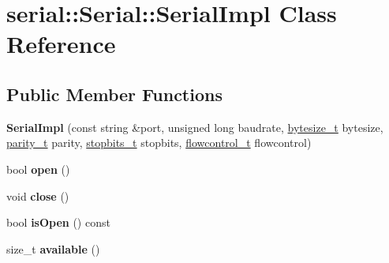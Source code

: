 \hypertarget{classserial_1_1serial_1_1_serial_1_1_serial_impl}{}\section{serial\+:\+:Serial\+:\+:Serial\+Impl Class Reference}
\label{classserial_1_1serial_1_1_serial_1_1_serial_impl}
\subsection*{Public Member Functions}
\begin{DoxyCompactItemize}
\item 
{\bfseries Serial\+Impl} (const string \&port, unsigned long baudrate, \hyperlink{namespaceserial_a00b3281fa11cea770c0b0c8a106080f8}{bytesize\+\_\+t} bytesize, \hyperlink{namespaceserial_a8f45d26bf7c9a06659e75b5004a50481}{parity\+\_\+t} parity, \hyperlink{namespaceserial_af5b116611d6628a3aa8f788fdc09f469}{stopbits\+\_\+t} stopbits, \hyperlink{namespaceserial_a93ef57a314b4e562f9eded6c15d34351}{flowcontrol\+\_\+t} flowcontrol)\hypertarget{classserial_1_1serial_1_1_serial_1_1_serial_impl_a1c97cde16ec9282e1fe26764cc2ce4ea}{}\label{classserial_1_1serial_1_1_serial_1_1_serial_impl_a1c97cde16ec9282e1fe26764cc2ce4ea}

\item 
bool {\bfseries open} ()\hypertarget{classserial_1_1serial_1_1_serial_1_1_serial_impl_a77d836bb85da64fc5a67d980db814cbd}{}\label{classserial_1_1serial_1_1_serial_1_1_serial_impl_a77d836bb85da64fc5a67d980db814cbd}

\item 
void {\bfseries close} ()\hypertarget{classserial_1_1serial_1_1_serial_1_1_serial_impl_aae71a048817d41c224b0824cd19b40d0}{}\label{classserial_1_1serial_1_1_serial_1_1_serial_impl_aae71a048817d41c224b0824cd19b40d0}

\item 
bool {\bfseries is\+Open} () const \hypertarget{classserial_1_1serial_1_1_serial_1_1_serial_impl_a1fb0393b7ad279bc70a8b265ea6bc1c2}{}\label{classserial_1_1serial_1_1_serial_1_1_serial_impl_a1fb0393b7ad279bc70a8b265ea6bc1c2}

\item 
size\+\_\+t {\bfseries available} ()\hypertarget{classserial_1_1serial_1_1_serial_1_1_serial_impl_ad3898b08a53ac00af6f492afc3b00475}{}\label{classserial_1_1serial_1_1_serial_1_1_serial_impl_ad3898b08a53ac00af6f492afc3b00475}


\end{DoxyCompactItemize}
